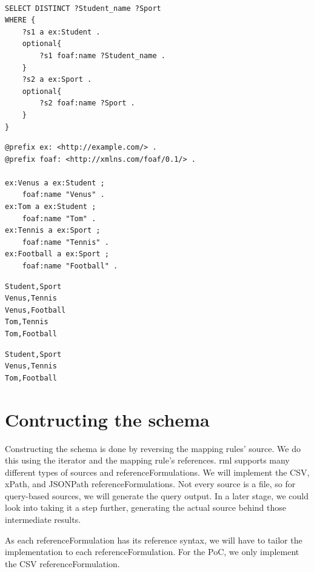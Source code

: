 \begin{lstlisting}[caption={Bad join query (trimmed)}, label={lst:bad_join_query}, captionpos=b, basicstyle=\small]






SELECT DISTINCT ?Student_name ?Sport
WHERE {
    ?s1 a ex:Student .
    optional{
        ?s1 foaf:name ?Student_name .
    }
    ?s2 a ex:Sport .
    optional{
        ?s2 foaf:name ?Sport .
    }
}
\end{lstlisting}

\begin{lstlisting}[caption={Bad join knowledge graph}, label={lst:bad_join_kg}, captionpos=b, basicstyle=\small]
@prefix ex: <http://example.com/> .
@prefix foaf: <http://xmlns.com/foaf/0.1/> .

ex:Venus a ex:Student ;
    foaf:name "Venus" .
ex:Tom a ex:Student ;
    foaf:name "Tom" .
ex:Tennis a ex:Sport ;
    foaf:name "Tennis" .
ex:Football a ex:Sport ;
    foaf:name "Football" .
\end{lstlisting}

\begin{lstlisting}[caption={Bad join result}, label={lst:bad_join_result}, captionpos=b, basicstyle=\small]
Student,Sport
Venus,Tennis
Venus,Football
Tom,Tennis
Tom,Football
\end{lstlisting}

\begin{lstlisting}[caption={Bad join original source}, label={lst:bad_join_expected_result}, captionpos=b]
Student,Sport
Venus,Tennis
Tom,Football
\end{lstlisting}

\section{Contructing the schema}
\label{section:constructing_schema}
Constructing the schema is done by reversing the mapping rules' source. We do this using the iterator and the mapping rule's references. \acrshort{rml} supports many different types of sources and referenceFormulations. We will implement the CSV, xPath, and JSONPath referenceFormulations. Not every source is a file, so for query-based sources, we will generate the query output. In a later stage, we could look into taking it a step further, generating the actual source behind those intermediate results.

As each referenceFormulation has its reference syntax, we will have to tailor the implementation to each referenceFormulation. For the PoC, we only implement the CSV referenceFormulation. 

